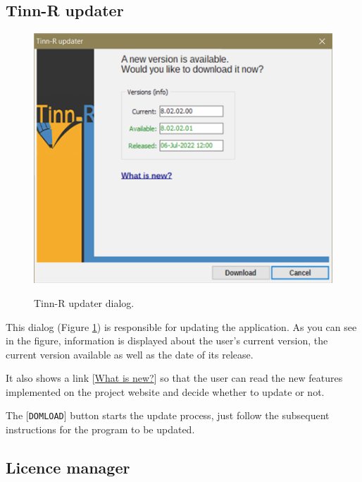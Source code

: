 \hypertarget{dlg_working_updater}{}
\subsection{Tinn-R updater}

\begin{figure}[H]
  \includegraphics[scale=0.50]{./res/dlg_updater.png} \\
  \caption{Tinn-R updater dialog.}
  \label{fig:dlg_updater}
\end{figure}
This dialog
(Figure \ref{fig:dlg_updater})
is responsible for updating the application. As you can see in the figure, information is displayed
about the user's current version, the current version available as well as the date of its release.

It also shows a link [\href{https://tinn-r.org/en/download#patch}{What is new?}] so that the user can read the new features implemented on the
project website and decide whether to update or not.

The [\texttt{DOMLOAD}] button starts the update process, just follow the subsequent instructions for the program
to be updated.


\hypertarget{dlg_working_updater}{}
\subsection{Licence manager}

